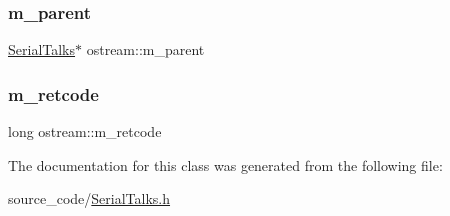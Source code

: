 \subsubsection{\texorpdfstring{m\+\_\+parent}{m\_parent}}
{\footnotesize\ttfamily \hyperlink{class_serial_talks}{Serial\+Talks}$\ast$ ostream\+::m\+\_\+parent\hspace{0.3cm}{\ttfamily [protected]}}

\mbox{\label{classostream_a00f9816ccfffe3c50d00726be18270a3}} 
\subsubsection{\texorpdfstring{m\+\_\+retcode}{m\_retcode}}
{\footnotesize\ttfamily long ostream\+::m\+\_\+retcode\hspace{0.3cm}{\ttfamily [protected]}}



The documentation for this class was generated from the following file\+:\begin{DoxyCompactItemize}
\item 
source\+\_\+code/\hyperlink{_serial_talks_8h}{Serial\+Talks.\+h}\end{DoxyCompactItemize}
